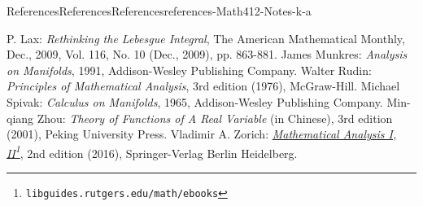 \documentclass[oneside,10pt,]{book}
\newcommand{\pubtitle}[1]{\textsl{#1}}
\numberwithin{equation}{section}
\begin{document}
\begin{references-chapter-numberless}{References}{References}{}{References}{}{}{references-Math412-Notes-k-a}
\begin{referencelist}
\hypertarget{biblio-Math412-Notes-k-a-b}{}P. Lax: \pubtitle{Rethinking the Lebesgue Integral}, The American Mathematical Monthly, Dec., 2009, Vol. 116, No. 10 (Dec., 2009), pp. 863-881.
\hypertarget{biblio-Math412-Notes-k-a-c}{}James Munkres: \pubtitle{Analysis on Manifolds}, 1991, Addison-Wesley Publishing Company.
\hypertarget{biblio-Math412-Notes-k-a-d}{}Walter Rudin: \pubtitle{Principles of Mathematical Analysis}, 3rd edition (1976), McGraw-Hill.
\hypertarget{biblio-Math412-Notes-k-a-e}{}Michael Spivak: \pubtitle{Calculus on Manifolds}, 1965, Addison-Wesley Publishing Company.
\hypertarget{biblio-Math412-Notes-k-a-f}{}Min-qiang Zhou: \pubtitle{Theory of Functions of A Real Variable} (in Chinese), 3rd edition (2001), Peking University Press.
\hypertarget{biblio-Math412-Notes-k-a-g}{}Vladimir A. Zorich: \pubtitle{\href{https://libguides.rutgers.edu/math/ebooks}{Mathematical Analysis I, II}\footnote{\nolinkurl{libguides.rutgers.edu/math/ebooks}\label{fn-Math412-Notes-k-a-g-a-b}}}, 2nd edition (2016), Springer-Verlag Berlin Heidelberg.
\end{referencelist}
\end{references-chapter-numberless}
\end{document}
